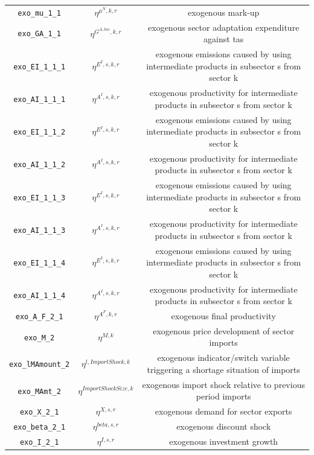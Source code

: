 \begin{center}
\begin{longtable}{ccc}
\texttt{exo\_mu\_1\_1} & ${\eta^{\mu^{N},k,r}}$ & exogenous mark-up\\
\texttt{exo\_GA\_1\_1} & ${\eta^{G^{A,tas},k,r}}$ & exogenous sector adaptation expenditure against tas\\
\texttt{exo\_EI\_1\_1\_1} & ${\eta^{E^{I},s,k,r}}$ & exogenous emissions caused by using intermediate products in subsector s from sector k\\
\texttt{exo\_AI\_1\_1\_1} & ${\eta^{A^{I},s,k,r}}$ & exogenous productivity for intermediate products in subsector s from sector k\\
\texttt{exo\_EI\_1\_1\_2} & ${\eta^{E^{I},s,k,r}}$ & exogenous emissions caused by using intermediate products in subsector s from sector k\\
\texttt{exo\_AI\_1\_1\_2} & ${\eta^{A^{I},s,k,r}}$ & exogenous productivity for intermediate products in subsector s from sector k\\
\texttt{exo\_EI\_1\_1\_3} & ${\eta^{E^{I},s,k,r}}$ & exogenous emissions caused by using intermediate products in subsector s from sector k\\
\texttt{exo\_AI\_1\_1\_3} & ${\eta^{A^{I},s,k,r}}$ & exogenous productivity for intermediate products in subsector s from sector k\\
\texttt{exo\_EI\_1\_1\_4} & ${\eta^{E^{I},s,k,r}}$ & exogenous emissions caused by using intermediate products in subsector s from sector k\\
\texttt{exo\_AI\_1\_1\_4} & ${\eta^{A^{I},s,k,r}}$ & exogenous productivity for intermediate products in subsector s from sector k\\
\texttt{exo\_A\_F\_2\_1} & ${\eta^{A^F,k,r}}$ & exogenous final productivity\\
\texttt{exo\_M\_2} & ${\eta^{M,k}}$ & exogenous price development of sector imports\\
\texttt{exo\_lMAmount\_2} & ${\eta^{l,Import Shock,k}}$ & exogenous indicator/switch variable triggering a shortage situation of imports\\
\texttt{exo\_MAmt\_2} & ${\eta^{Import Shock Size,k}}$ & exogenous import shock relative to previous period imports\\
\texttt{exo\_X\_2\_1} & ${\eta^{X,s,r}}$ & exogenous demand for sector exports\\
\texttt{exo\_beta\_2\_1} & ${\eta^{beta,s,r}}$ & exogenous discount shock\\
\texttt{exo\_I\_2\_1} & ${\eta^{I,s,r}}$ & exogenous investment growth\\

\end{longtable}
\end{center}

